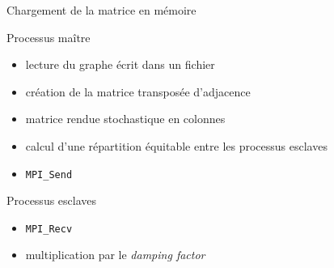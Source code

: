 \documentclass{beamer}
\begin{document}
  \begin{frame}{Chargement de la matrice en mémoire}
    \begin{minipage}[c]{.45\linewidth}
      \begin{block}{Processus maître}
        \scriptsize{\begin{itemize}
          \item<1-> lecture du graphe écrit dans un fichier
          \item<2-> création de la matrice transposée d'adjacence
          \item<3-> matrice rendue stochastique en colonnes
          \item<4-> calcul d'une répartition équitable entre les processus esclaves
          \item<5-> \texttt{MPI\_Send}
          \vspace{1cm}
        \end{itemize}}
      \end{block}
    \end{minipage} \hfill
    \begin{minipage}[c]{.45\linewidth}
      \begin{block}{Processus esclaves}
        \vspace{3.3cm}
        \scriptsize{\begin{itemize}
          \item<5-> \texttt{MPI\_Recv}
          \item<6-> multiplication par le \textit{damping factor}
        \end{itemize}}
      \end{block}
    \end{minipage}
  \end{frame}
  
\end{document}
